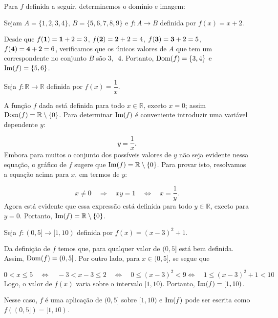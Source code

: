 \documentclass[../main.tex]{subfiles}
\begin{document}
\begin{ex}
Para \(f\) definida a seguir, determinemos o domínio e imagem:
\begin{compactenum}[a)]
\item Sejam \(A=\{1,2,3,4\}\), \(B=\{5,6,7,8,9\}\) e \(f:A\rightarrow B\) definida por \(f(x)=x+2\).\\
\begin{solution}
Desde que \(f({\bf 1})={\bf 1}+2=3\), \(f({\bf 2})={\bf 2}+2=4\), \(f({\bf 3})={\bf 3}+2=5\), \(f({\bf 4})={\bf 4}+2=6\), verificamos que os únicos valores de \(A\) que tem um correspondente no conjunto \(B\) são \(3,\,\,\,4\). Portanto, \({\rm Dom}(f)=\{3,4\}\) e \({\rm Im}(f)=\{5,6\}\).
\end{solution}
\item Seja \(f:\mathbb{R}\rightarrow \mathbb{R}\) definida por \(f(x)=\dfrac{1}{x}\).\\
\begin{solution}
A função \(f\) dada está definida para todo \(x\in \mathbb{R}\), exceto \(x=0\); assim \({\rm Dom}(f)=\mathbb{R}\setminus\{0\}\).
Para determinar \({\rm Im}(f)\) é conveniente introduzir uma variável dependente \(y\):

\[y=\dfrac{1}{x}.\]
Embora para muitos o conjunto dos possíveis valores de \(y\) não seja evidente nessa equação, o gráfico de \(f\) sugere que \({\rm Im}(f)=\mathbb{R}\setminus\{0\}\). Para provar isto, resolvamos a equação acima para \(x\), em termos de \(y\):

\[x\neq 0\quad\Rightarrow\quad xy=1\quad\Leftrightarrow\quad x=\dfrac{1}{y}.\]
Agora está evidente que essa expressão está definida para todo \(y\in \mathbb{R}\), exceto para \(y=0\). Portanto, \({\rm Im}(f)=\mathbb{R}\setminus\{0\}\).
\end{solution}
\item Seja \(f:(0,5]\to [1,10)\) definida por \(f(x)=(x-3)^2 +1\).\\
\begin{solution}
Da definição de \(f\) temos que, para qualquer valor de $(0, 5]$ está bem definida. Assim, \({\rm Dom}(f)=(0,5]\). Por outro lado, para \(x \in (0,5]\), se segue que

\[0<x\leq 5\quad \Leftrightarrow\quad -3<x-3\leq 2 \quad \Leftrightarrow\quad 0\leq (x-3)^2<9\Leftrightarrow\quad 1\leq (x-3)^2+1<10\]
Logo, o valor de \(f(x)\) varia sobre o intervalo \([1,10)\). Portanto, \({\rm Im}(f)=[1,10)\).

Nesse caso, \(f\) é uma aplicação de \((0,5]\) sobre \([1,10)\) e \({\rm Im}(f)\) pode ser escrita como \(f((0,5])=[1,10)\). 
\end{solution}
\end{compactenum}
\end{ex}
\end{document}
